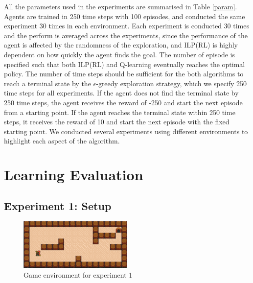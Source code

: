 All the parameters used in the experiments are summarised in Table \ref{param}.
Agents are trained in 250 time steps with 100 episodes, and conducted the same experiment 30 times in each environment. 
Each experiment is conducted 30 times and the perform is averaged across the experiments, 
since the performance of the agent is affected by the randomness of the exploration,
and ILP(RL) is highly dependent on how quickly the agent finds the goal.
The number of episode is specified such that both ILP(RL) and Q-learning eventually reaches the optimal policy.
The number of time steps should be sufficient for the both algorithms to reach a terminal state by the $\epsilon$-greedy exploration strategy, 
which we specify 250 time steps for all experiments. 
If the agent does not find the terminal state by 250 time steps, the agent receives the reward of -250 and 
start the next episode from a starting point. If the agent reaches the terminal state within 250 time steps, 
it receives the reward of 10 and start the next episode with the fixed starting point. 
We conducted several experiments using different environments to highlight each aspect of the algorithm.
\section{Learning Evaluation}
\label{sec:learning_evaluation}

\subsection{Experiment 1: Setup}
\label{subsec:experiement1_setup}

\begin{figure}[!htb]
\centering
\includegraphics[width=0.5\textwidth]{./figures/experiment1}
\caption{Game environment for experiment 1}
\label{fig:experiment1}
\end{figure}
    
